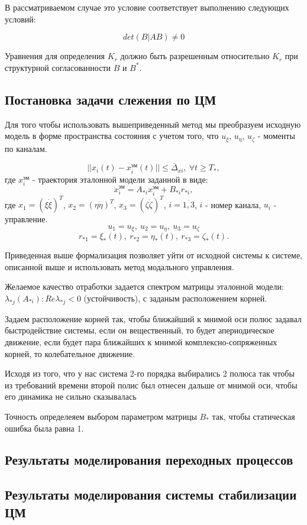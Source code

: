 В рассматриваемом случае это условие соответствует выполнению следующих условий:

\begin{equation}
\label{eq:usl_this_1}
det \left( B|AB\right) \neq 0
\end{equation}

Уравнения для определения $K_r$ должно быть разрешенным относительно $K_r$ при структурной согласованности $B$ и $B^{*}$.

\clearpage

\subsection{Постановка задачи слежения по ЦМ}
Для того чтобы использовать вышеприведенный метод мы преобразуем исходную модель в форме пространства состояния с учетом того, что $u_{\xi}$, $u_{\eta}$, $u_{\zeta}$ - моменты по каналам.

\begin{equation}
\label{eq:norm_slej}
|| x_i(t) - x_i^{\text{эм}} (t) || \leq \overline{\Delta}_{xi}, \ \forall t \geq T_{*},
\end{equation}
где $x_i^{\text{эм}}$ - траектория эталонной модели заданной в виде:
\begin{equation}
\label{eq:ur_etalon_traektor}
\Dot{x}_i^{\text{эм}} = A_{*i} x_i^{\text{эм}} + B_{*i} r_{*i},
\end{equation}
где $x_1 = (\xi \dot{\xi})^T$, $x_2 = (\eta \dot{\eta})^T$, $x_3 = (\zeta \dot{\zeta})^T$, $i = \overline{1, 3}$, $i$ - номер канала, $u_i$ - управление.
$$u_1 = u_{\xi}, \  u_2 = u_{\eta}, \ u_3 = u_{\zeta}$$
$$r_{*1} = \xi_{*} (t), \ r_{*2} = \eta_{*} (t), \ r_{*3} = \zeta_{*} (t).$$

Приведенная выше формализация позволяет уйти от исходной системы к системе, описанной выше и использовать метод модального управления. 

Желаемое качество отработки задается спектром матрицы эталонной модели: $\lambda_{*j}(A_{*i}):Re \lambda_{*j} < 0$ (устойчивость), с заданым расположением корней.

Задаем расположение корней так, чтобы ближайший к мнимой оси полюс задавал быстродействие системы, если он вещественный, то будет апериодическое движение, если будет пара ближайших к мнимой  комплексно-сопряженных корней, то колебательное движение.

Исходя из того, что у нас система 2-го порядка выбирались 2 полюса так чтобы из требований времени второй полис был отнесен дальше от мнимой оси, чтобы его динамика не сильно сказывалась

Точность определеяем выбором параметром матрицы $B_{*}$ так, чтобы статическая ошибка была равна 1.
\clearpage

\subsection{Результаты моделирования переходных процессов}
\clearpage

\subsection{Результаты моделирования системы стабилизации ЦМ}
\clearpage